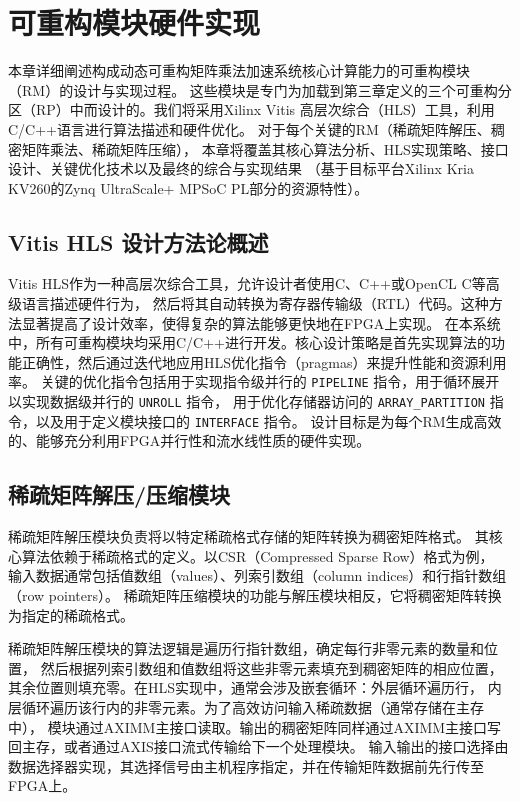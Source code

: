 \chapter{可重构模块硬件实现}

本章详细阐述构成动态可重构矩阵乘法加速系统核心计算能力的可重构模块（RM）的设计与实现过程。
这些模块是专门为加载到第三章定义的三个可重构分区（RP）中而设计的。我们将采用Xilinx Vitis 高层次综合（HLS）工具，利用C/C++语言进行算法描述和硬件优化。
对于每个关键的RM（稀疏矩阵解压、稠密矩阵乘法、稀疏矩阵压缩），
本章将覆盖其核心算法分析、HLS实现策略、接口设计、关键优化技术以及最终的综合与实现结果
（基于目标平台Xilinx Kria KV260的Zynq UltraScale+ MPSoC PL部分的资源特性）。

\section{Vitis HLS 设计方法论概述}

Vitis HLS作为一种高层次综合工具，允许设计者使用C、C++或OpenCL C等高级语言描述硬件行为，
然后将其自动转换为寄存器传输级（RTL）代码。这种方法显著提高了设计效率，使得复杂的算法能够更快地在FPGA上实现。
在本系统中，所有可重构模块均采用C/C++进行开发。核心设计策略是首先实现算法的功能正确性，然后通过迭代地应用HLS优化指令（pragmas）来提升性能和资源利用率。
关键的优化指令包括用于实现指令级并行的 \verb|PIPELINE| 指令，用于循环展开以实现数据级并行的 \verb|UNROLL| 指令，
用于优化存储器访问的 \verb|ARRAY_PARTITION| 指令，以及用于定义模块接口的 \verb|INTERFACE| 指令。
设计目标是为每个RM生成高效的、能够充分利用FPGA并行性和流水线性质的硬件实现。

\section{稀疏矩阵解压/压缩模块}

稀疏矩阵解压模块负责将以特定稀疏格式存储的矩阵转换为稠密矩阵格式。
其核心算法依赖于稀疏格式的定义。以CSR（Compressed Sparse Row）格式为例，
输入数据通常包括值数组（values）、列索引数组（column indices）和行指针数组（row pointers）。
稀疏矩阵压缩模块的功能与解压模块相反，它将稠密矩阵转换为指定的稀疏格式。

稀疏矩阵解压模块的算法逻辑是遍历行指针数组，确定每行非零元素的数量和位置，
然后根据列索引数组和值数组将这些非零元素填充到稠密矩阵的相应位置，
其余位置则填充零。在HLS实现中，通常会涉及嵌套循环：外层循环遍历行，
内层循环遍历该行内的非零元素。为了高效访问输入稀疏数据（通常存储在主存中），
模块通过AXIMM主接口读取。输出的稠密矩阵同样通过AXIMM主接口写回主存，或者通过AXIS接口流式传输给下一个处理模块。
输入输出的接口选择由数据选择器实现，其选择信号由主机程序指定，并在传输矩阵数据前先行传至FPGA上。

